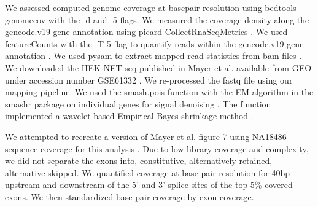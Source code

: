 We assessed computed genome coverage at basepair resolution using bedtools genomecov with the -d and -5 flags. We measured the coverage density along the gencode.v19 gene annotation using picard CollectRnaSeqMetrics \citep{frankish_gencode_2019,quinlan_bedtools_2010}. We used featureCounts with the -T 5 flag to quantify reads within the gencode.v19 gene annotation \citep{frankish_gencode_2019, Liao2014}. We used pysam to extract mapped read statistics from bam files \citep{Li2009}. We downloaded the HEK NET-seq published in Mayer et al. available from GEO under accession number GSE61332 \cite{mayer_genome-wide_2016}.  We re-processed the fastq file using our mapping pipeline. We used the smash.pois function with the EM algorithm in the smashr package on individual genes for signal denoising \citep{xing_flexible_2016}. The function implemented a wavelet-based Empirical Bayes shrinkage method \citep{xing_flexible_2016}. 

We attempted to recreate a version of Mayer et al. figure 7 using NA18486 sequence coverage for this analysis \cite{mayer_genome-wide_2016}. Due to low library coverage and complexity, we did not separate the exons into, constitutive, alternatively retained, alternative skipped. We quantified coverage at base pair resolution for 40bp upstream and downstream of the 5' and 3' splice sites of the top 5\% covered exons. We then standardized base pair coverage by exon coverage.   
